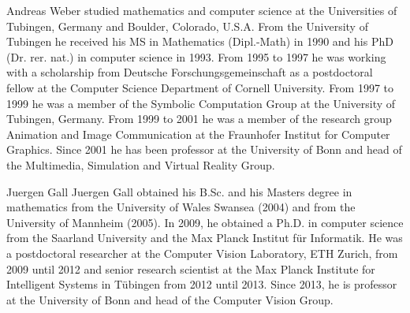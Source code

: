\documentclass[10pt,journal,compsoc]{IEEEtran}
\begin{document}
\begin{IEEEbiography}
{Andreas Weber} studied mathematics and computer
science at the Universities of Tubingen, Germany and Boulder, Colorado, U.S.A. From
the University of Tubingen he received his MS in Mathematics (Dipl.-Math) in 1990 and his PhD
(Dr. rer. nat.) in computer science in 1993. From 1995 to 1997 he was working with a scholarship
from Deutsche Forschungsgemeinschaft as a postdoctoral fellow at the Computer Science 
Department of Cornell University. From 1997 to 1999 he was a member of the Symbolic Computation
Group at the University of Tubingen, Germany. From 1999 to 2001 he was a member of the research group Animation and Image
Communication at the Fraunhofer Institut for Computer Graphics. Since 2001 he has been professor at the University of Bonn and head of the Multimedia, Simulation and Virtual Reality Group. 
\end{IEEEbiography}




\begin{IEEEbiography}
{Juergen Gall}
Juergen Gall obtained his B.Sc. and his Masters degree in
mathematics from the University of Wales Swansea (2004)
and from the University of Mannheim (2005). In 2009,
he obtained a Ph.D. in computer science from the Saarland
University and the Max Planck Institut f{\"u}r Informatik. He
was a postdoctoral researcher at the Computer Vision Laboratory, ETH Zurich,
from 2009 until 2012 and senior research scientist at the Max Planck Institute for Intelligent
Systems in T{\"u}bingen from 2012 until 2013. Since 2013,
he is professor at the University of Bonn and head of the
Computer Vision Group. 
\end{IEEEbiography}



\vfill
\end{document}
